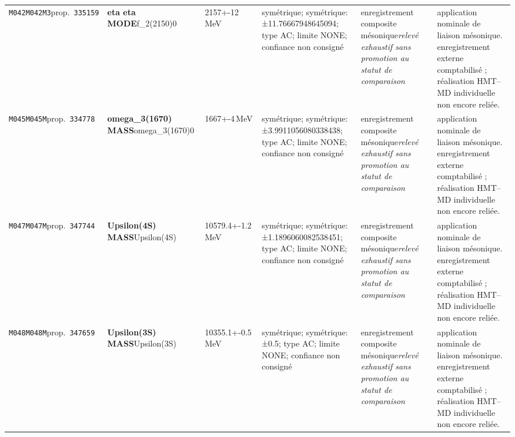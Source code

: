 \begin{landscape}
\begin{longtable}{L{1.85cm}L{4.45cm}L{2.35cm}L{4.05cm}L{3.35cm}L{7.15cm}}
\texttt{M042}\newline \texttt{M042M3}\newline prop.\ \texttt{335159} & \textbf{eta eta MODE}\newline f\_\allowbreak{}2(2150)0 & 2157+-12\,MeV & symétrique; symétrique: ±11.76667948645094; type AC; limite NONE; confiance non consigné & enregistrement composite mésonique\newline \emph{relevé exhaustif sans promotion au statut de comparaison} & application nominale de liaison mésonique. enregistrement externe comptabilisé ; réalisation HMT--MD individuelle non encore reliée. \\
\texttt{M045}\newline \texttt{M045M}\newline prop.\ \texttt{334778} & \textbf{omega\_\allowbreak{}3(1670) MASS}\newline omega\_\allowbreak{}3(1670)0 & 1667+-4\,MeV & symétrique; symétrique: ±3.9911056080338438; type AC; limite NONE; confiance non consigné & enregistrement composite mésonique\newline \emph{relevé exhaustif sans promotion au statut de comparaison} & application nominale de liaison mésonique. enregistrement externe comptabilisé ; réalisation HMT--MD individuelle non encore reliée. \\
\texttt{M047}\newline \texttt{M047M}\newline prop.\ \texttt{347744} & \textbf{Upsilon(4S) MASS}\newline Upsilon(4S) & 10579.4+-1.2\,MeV & symétrique; symétrique: ±1.1896060082538451; type AC; limite NONE; confiance non consigné & enregistrement composite mésonique\newline \emph{relevé exhaustif sans promotion au statut de comparaison} & application nominale de liaison mésonique. enregistrement externe comptabilisé ; réalisation HMT--MD individuelle non encore reliée. \\
\texttt{M048}\newline \texttt{M048M}\newline prop.\ \texttt{347659} & \textbf{Upsilon(3S) MASS}\newline Upsilon(3S) & 10355.1+-0.5\,MeV & symétrique; symétrique: ±0.5; type AC; limite NONE; confiance non consigné & enregistrement composite mésonique\newline \emph{relevé exhaustif sans promotion au statut de comparaison} & application nominale de liaison mésonique. enregistrement externe comptabilisé ; réalisation HMT--MD individuelle non encore reliée. \\

\end{longtable}
\end{landscape}
